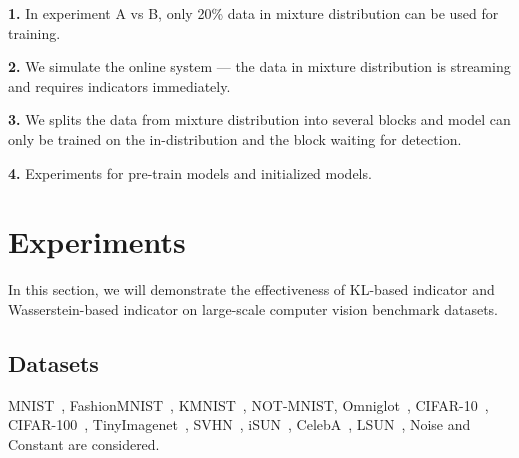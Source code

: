 \documentclass[letterpaper]{article} %
\begin{document}
\noindent \textbf{1.} In experiment A vs B, only 20\% data in mixture distribution can be used for training. 

\noindent \textbf{2.} We simulate the online system --- the data in mixture distribution is streaming and requires indicators immediately. 

\noindent \textbf{3.} We splits the data from mixture distribution into several blocks and model can only be trained on the in-distribution and the block waiting for detection.  

\noindent \textbf{4.} Experiments for pre-train models and initialized models. 

\section{Experiments}\label{sec6}
In this section, we will demonstrate the effectiveness of KL-based indicator and Wasserstein-based indicator on large-scale computer vision benchmark datasets. 

\subsection{Datasets}

MNIST~\cite{lecun1998gradient-based}, FashionMNIST~\cite{xiao2017/online}, KMNIST~\cite{clanuwat2018deep}, NOT-MNIST, Omniglot~\cite{lake2015human}, CIFAR-10~\cite{krizhevsky2009learning}, CIFAR-100~\cite{krizhevsky2009learning}, TinyImagenet~\cite{deng2009imagenet}, SVHN~\cite{netzer2011reading}, iSUN~\cite{xu2015turkergaze}, CelebA~\cite{liu2015deep}, LSUN~\cite{yu2015lsun}, Noise and Constant are considered. 
\end{document}
